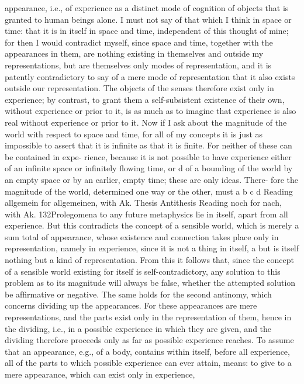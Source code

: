 appearance, i.e., of experience as a distinct mode of cognition of objects
that is granted to human beings alone. I must not say of that which I
think in space or time: that it is in itself in space and time, independent
of this thought of mine; for then I would contradict myself, since space
and time, together with the appearances in them, are nothing existing
in themselves and outside my representations, but are themselves only
modes of representation, and it is patently contradictory to say of a mere
mode of representation that it also exists outside our representation. The
objects of the senses therefore exist only in experience; by contrast, to
grant them a self-subsistent existence of their own, without experience
or prior to it, is as much as to imagine that experience is also real without
experience or prior to it.
Now if I ask about the magnitude of the world with respect to space
and time, for all of my concepts it is just as impossible to assert that it is
inﬁnite as that it is ﬁnite. For neither of these can be contained in expe-
rience, because it is not possible to have experience either of an inﬁnite
space or inﬁnitely ﬂowing time, or d of a bounding of the world by an
empty space or by an earlier, empty time; these are only ideas. There-
fore the magnitude of the world, determined one way or the other, must
a
b
c
d
Reading allgemein for allgemeinen, with Ak.
Thesis
Antithesis
Reading noch for nach, with Ak.
132Prolegomena to any future metaphysics
lie in itself, apart from all experience. But this contradicts the concept
of a sensible world, which is merely a sum total of appearance, whose
existence and connection takes place only in representation, namely in
experience, since it is not a thing in itself, a but is itself nothing but a
kind of representation. From this it follows that, since the concept of a
sensible world existing for itself is self-contradictory, any solution to this
problem as to its magnitude will always be false, whether the attempted
solution be afﬁrmative or negative.
The same holds for the second antinomy, which concerns dividing
up the appearances. For these appearances are mere representations,
and the parts exist only in the representation of them, hence in the
dividing, i.e., in a possible experience in which they are given, and the
dividing therefore proceeds only as far as possible experience reaches. To
assume that an appearance, e.g., of a body, contains within itself, before
all experience, all of the parts to which possible experience can ever attain,
means: to give to a mere appearance, which can exist only in experience,
